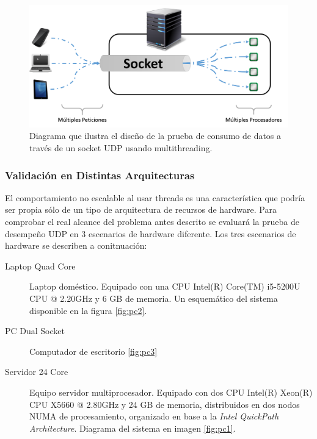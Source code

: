 \begin{figure}[!h]
	\centering
	\includegraphics[scale=0.5]{imagenes/conf_multi_thread}
	\caption{Diagrama que ilustra el diseño de la prueba de consumo de datos a través de un socket UDP usando multithreading.}
	\label{fig:testUDP}
\end{figure}

\subsubsection{Validación en Distintas Arquitecturas}

El comportamiento no escalable al usar threads es una característica que podría ser propia sólo de un tipo de arquitectura de recursos de hardware. Para comprobar el real alcance del problema antes descrito se evaluará la prueba de desempeño UDP en 3 escenarios de hardware diferente. Los tres escenarios de hardware se describen a conitnuación:

\begin{description}
\item[Laptop Quad Core] Laptop doméstico. Equipado con una CPU Intel(R) Core(TM) i5-5200U CPU @ 2.20GHz y 6 GB de memoria. Un esquemático del sistema disponible en la figura \ref{fig:pc2}.
\item[PC Dual Socket] Computador de escritorio \ref{fig:pc3}
\item[Servidor 24 Core] Equipo servidor multiprocesador. Equipado con dos CPU Intel(R) Xeon(R) CPU X5660 @ 2.80GHz y 24 GB de memoria, distribuidos en dos nodos NUMA de procesamiento, organizado en base a la \emph{Intel QuickPath Architecture}. Diagrama del sistema en imagen \ref{fig:pc1}.
\end{description}

